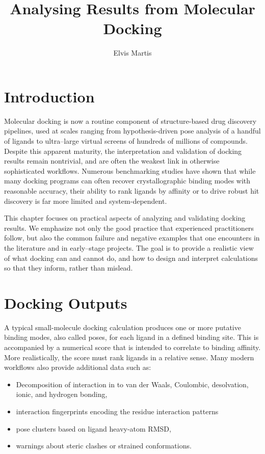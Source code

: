 \documentclass[12pt,a4paper]{article}
\title{Analysing Results from Molecular Docking}
\author{Elvis Martis}
\date{}
\begin{document}
\maketitle

\section{Introduction}

Molecular docking is now a routine component of structure-based drug discovery pipelines, used at scales ranging from hypothesis-driven pose analysis of a handful of ligands to ultra–large virtual screens of hundreds of millions of compounds. Despite this apparent maturity, the interpretation and validation of docking results remain nontrivial, and are often the weakest link in otherwise sophisticated workflows. Numerous benchmarking studies have shown that while many docking programs can often recover crystallographic binding modes with reasonable accuracy, their ability to rank ligands by affinity or to drive robust hit discovery is far more limited and system-dependent.\cite{CH8_Warren2006,CH8_Kitchen2004,CH8_Cheng2009}

This chapter focuses on practical aspects of analyzing and validating docking results. We emphasize not only the good practice that experienced practitioners follow, but also the common failure and negative examples that one encounters in the literature and in early–stage projects. The goal is to provide a realistic view of what docking can and cannot do, and how to design and interpret calculations so that they inform, rather than mislead.

\section{Docking Outputs}

A typical small-molecule docking calculation produces one or more putative binding modes, also called poses, for each ligand in a defined binding site. This is accompanied by a numerical score that is intended to correlate to binding affinity.  More realistically, the score must rank ligands in a relative sense.\cite{CH8_Kitchen2004,CH8_Huang2011} Many modern workflows also provide additional data such as:

\begin{itemize}
  \item  Decomposition of interaction in to van der Waals, Coulombic, desolvation, ionic, and hydrogen bonding,
  \item interaction fingerprints encoding the residue interaction patterns
  \item pose clusters based on ligand heavy-atom RMSD,
  \item warnings about steric clashes or strained conformations.
\end{itemize}
\end{document}

